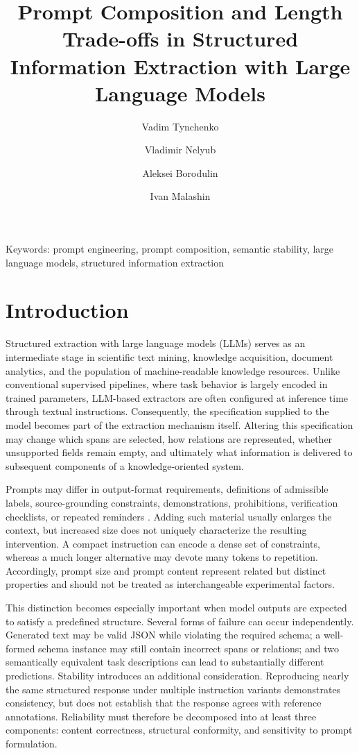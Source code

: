 \documentclass[fleqn,10pt]{wlscirep-authoryear}
\title{Prompt Composition and Length Trade-offs in Structured Information
Extraction with Large Language Models}
\author[1]{Vadim Tynchenko}
\author[1]{Vladimir Nelyub}
\author[1]{Aleksei Borodulin}
\author[1*]{Ivan Malashin}
\affil[1]{Bauman Moscow State Technical University, 105005 Moscow, Russia}
\affil[*]{ivan.p.malashin@gmail.com}
\begin{document}
\flushbottom
\maketitle
%
%
\thispagestyle{empty}

\noindent Keywords: prompt engineering, prompt composition, semantic stability, large language models, structured information extraction


\section{Introduction}
\label{sec:introduction}

Structured extraction with large language models (LLMs) serves as
an intermediate stage in scientific text mining, knowledge acquisition, document
analytics, and the population of machine-readable knowledge resources. Unlike
conventional supervised pipelines, where task behavior is largely encoded in
trained parameters, LLM-based extractors are often configured at inference time
through textual instructions. Consequently, the specification supplied to the
model becomes part of the extraction mechanism itself. Altering this specification
may change which spans are selected, how relations are represented, whether
unsupported fields remain empty, and ultimately what information is delivered to
subsequent components of a knowledge-oriented system.

Prompts may differ in output-format requirements, definitions
of admissible labels, source-grounding constraints, demonstrations, prohibitions,
verification checklists, or repeated reminders
\cite{schulhoff2024prompt}. Adding such material usually enlarges the context,
but increased size does not uniquely characterize the resulting intervention.
A compact instruction can encode a dense set of constraints, whereas a much
longer alternative may devote many tokens to repetition. Accordingly, prompt
size and prompt content represent related but distinct properties and should not
be treated as interchangeable experimental factors.

This distinction becomes especially important when model outputs are expected to
satisfy a predefined structure. Several forms of failure can occur independently.
Generated text may be valid JSON while violating the required schema; a
well-formed schema instance may still contain incorrect spans or relations; and
two semantically equivalent task descriptions can lead to substantially different
predictions. Stability introduces an additional consideration. Reproducing nearly
the same structured response under multiple instruction variants demonstrates
consistency, but does not establish that the response agrees with reference
annotations. Reliability must therefore be decomposed into at least three
components: content correctness, structural conformity, and sensitivity to prompt
formulation.
\end{document}
